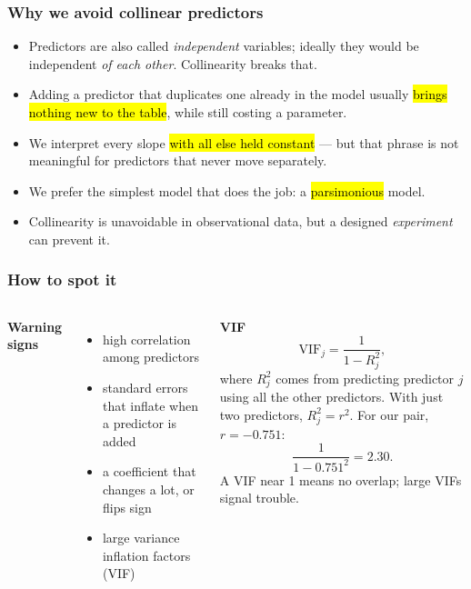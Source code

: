 \documentclass[slidestop,compress,mathserif]{beamer}
\begin{document}
\begin{frame}
\frametitle{Why we avoid collinear predictors}

\begin{itemize}
\item Predictors are also called \emph{independent} variables; ideally they would be independent \emph{of each other}. Collinearity breaks that.
\pause
\item Adding a predictor that duplicates one already in the model usually \hl{brings nothing new to the table}, while still costing a parameter.
\pause
\item We interpret every slope \hl{with all else held constant} --- but that phrase is not meaningful for predictors that never move separately.
\pause
\item We prefer the simplest model that does the job: a \hl{parsimonious} model.
\pause
\item Collinearity is unavoidable in observational data, but a designed \emph{experiment} can prevent it.
\vspace{-0.3em}
\end{itemize}

\end{frame}
\begin{frame}
\frametitle{How to spot it}

\begin{columns}[T]
\textbf{Warning signs}
\begin{itemize}
\item high correlation among predictors
\item standard errors that inflate when a predictor is added
\item a coefficient that changes a lot, or flips sign
\item large variance inflation factors (VIF)
\end{itemize}

\textbf{VIF}
\[
\mathrm{VIF}_j = \frac{1}{1-R_j^2},
\]
where $R_j^2$ comes from predicting predictor $j$ using all the other predictors. With just two predictors, $R_j^2=r^2$. For our pair, $r=-0.751$:
\[ \frac{1}{1-0.751^2}=2.30. \]
A VIF near 1 means no overlap; large VIFs signal trouble.
\end{columns}

\end{frame}
\end{document}
